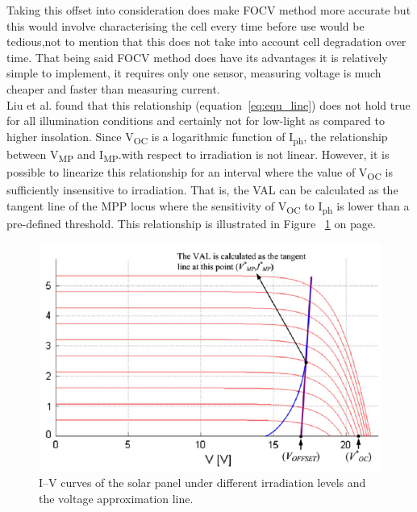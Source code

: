 Taking this offset into consideration does make \ac{FOCV} method more accurate but this would involve characterising the cell every time before use would be tedious,not to mention that this does not take into account cell degradation over time. That being said \ac{FOCV} method does have its advantages it is relatively simple to implement, it requires only one sensor, measuring voltage is much cheaper and faster than measuring current.\\
Liu et al.\cite{liu2011fast} found that this relationship (equation~\ref{eq:equ_line}) does not hold true for all illumination conditions and certainly not for low-light as compared to higher insolation. Since V\textsubscript{OC} is a logarithmic function of I\textsubscript{ph}, the relationship between  V\textsubscript{MP} and I\textsubscript{MP}.with respect to irradiation is not linear. However, it is possible to linearize this relationship for an interval where the value of V\textsubscript{OC} is sufficiently insensitive to irradiation. That is, the  \ac{VAL} can be calculated as the tangent line of the \ac{MPP} locus where the sensitivity of V\textsubscript{OC} to I\textsubscript{ph} is lower than a pre-defined threshold. This relationship is illustrated in Figure ~\ref{fig:Lui_IV_1} on page.\\
  
  \begin{figure}[H]
   \begin{center}
   \includegraphics[width=\textwidth]{images/IVCurve_lui}
   \caption{I–V curves of the solar panel under different irradiation levels and the voltage approximation line. \cite{liu2011fast} }
   \label{fig:Lui_IV_1}
   \end{center}
   \end{figure}
   
